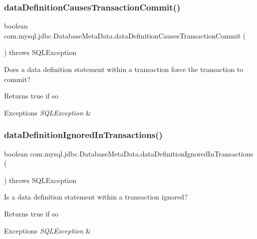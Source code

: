 \subsubsection{\texorpdfstring{data\+Definition\+Causes\+Transaction\+Commit()}{dataDefinitionCausesTransactionCommit()}}
{\footnotesize\ttfamily boolean com.\+mysql.\+jdbc.\+Database\+Meta\+Data.\+data\+Definition\+Causes\+Transaction\+Commit (\begin{DoxyParamCaption}{ }\end{DoxyParamCaption}) throws S\+Q\+L\+Exception}

Does a data definition statement within a transaction force the transaction to commit?

\begin{DoxyReturn}{Returns}
true if so 
\end{DoxyReturn}

\begin{DoxyExceptions}{Exceptions}
{\em S\+Q\+L\+Exception} & \\
\hline
\end{DoxyExceptions}
\mbox{\label{classcom_1_1mysql_1_1jdbc_1_1_database_meta_data_acc113d98cbf5da60459095401e8f91b7}} 
\subsubsection{\texorpdfstring{data\+Definition\+Ignored\+In\+Transactions()}{dataDefinitionIgnoredInTransactions()}}
{\footnotesize\ttfamily boolean com.\+mysql.\+jdbc.\+Database\+Meta\+Data.\+data\+Definition\+Ignored\+In\+Transactions (\begin{DoxyParamCaption}{ }\end{DoxyParamCaption}) throws S\+Q\+L\+Exception}

Is a data definition statement within a transaction ignored?

\begin{DoxyReturn}{Returns}
true if so 
\end{DoxyReturn}

\begin{DoxyExceptions}{Exceptions}
{\em S\+Q\+L\+Exception} & \\
\hline
\end{DoxyExceptions}
\mbox{\label{classcom_1_1mysql_1_1jdbc_1_1_database_meta_data_a2285b39a35023c91168afdebbfd4e935}} 
